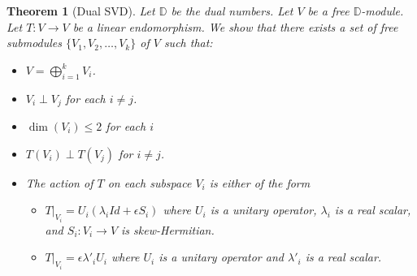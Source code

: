 \documentclass[
]{article}
\theoremstyle{theorem}
\newtheorem*{theorem}{Theorem}
\theoremstyle{proposition}
\begin{document}
\begin{theorem}[Dual SVD]
Let \(\mathbb D\) be the dual numbers. Let \(V\) be a free \(\mathbb D\)-module. Let \(T: V \to V\) be a linear endomorphism. We show that there exists a set of free submodules \(\{V_1, V_2, \dotsc, V_k\}\) of \(V\) such that:

\begin{itemize}
\item
  \(V = \bigoplus_{i=1}^k V_i\).
\item
  \(V_i \perp V_j\) for each \(i \neq j\).
\item
  \(\dim(V_i) \leq 2\) for each \(i\)
\item
  \(T(V_i) \perp T(V_j)\) for \(i \neq j\).
\item
  The action of \(T\) on each subspace \(V_i\) is either of the form

  \begin{itemize}
  \item
    \(T|_{V_i} = U_i (\lambda_i Id + \epsilon S_i)\) where \(U_i\) is a unitary operator, \(\lambda_i\) is a real scalar, and \(S_i:V_i \to V\) is skew-Hermitian.
  \item
    \(T|_{V_i} = \epsilon \lambda'_i U_i\) where \(U_i\) is a unitary operator and \(\lambda'_i\) is a real scalar.
  \end{itemize}
\end{itemize}
\end{theorem}
\end{document}
